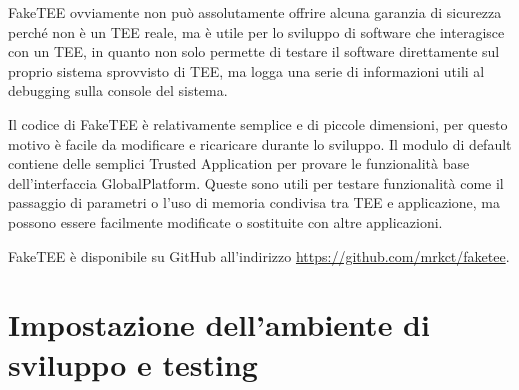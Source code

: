 \documentclass[12pt,italian]{report}
\begin{document}
FakeTEE ovviamente non può assolutamente offrire alcuna garanzia di sicurezza
perché non è un TEE reale, ma è utile per lo sviluppo di software che
interagisce con un TEE, in quanto non solo permette di testare il software
direttamente sul proprio sistema sprovvisto di TEE, ma logga una serie di
informazioni utili al debugging sulla console del sistema.

Il codice di FakeTEE è relativamente semplice e di piccole dimensioni, per
questo motivo è facile da modificare e ricaricare durante lo sviluppo.
Il modulo di default contiene delle semplici Trusted Application per provare
le funzionalità base dell'interfaccia GlobalPlatform.
Queste sono utili per testare funzionalità come il passaggio di parametri o
l'uso di memoria condivisa tra TEE e applicazione, ma possono essere
facilmente modificate o sostituite con altre applicazioni.

FakeTEE è disponibile su GitHub all'indirizzo
\url{https://github.com/mrkct/faketee}.

\chapter{Impostazione dell'ambiente di sviluppo e testing}
\label{chap:impostazione-ambiente-sviluppo-testing}



\end{document}
